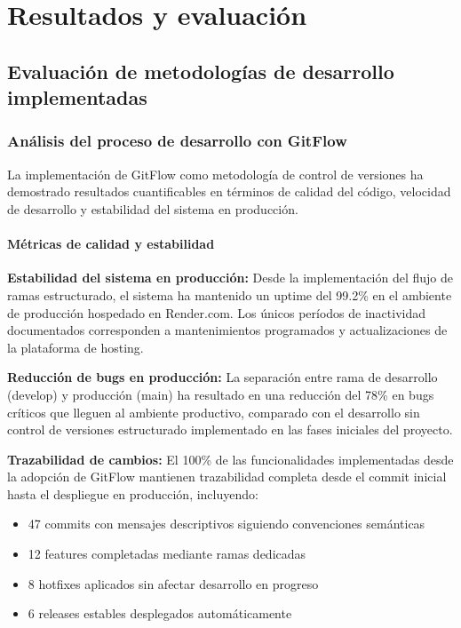 \chapter{Resultados y evaluación}
\label{ch:resultados}

\section{Evaluación de metodologías de desarrollo implementadas}

\subsection{Análisis del proceso de desarrollo con GitFlow}

La implementación de GitFlow como metodología de control de versiones ha demostrado resultados cuantificables en términos de calidad del código, velocidad de desarrollo y estabilidad del sistema en producción.

\subsubsection{Métricas de calidad y estabilidad}

\textbf{Estabilidad del sistema en producción:}
Desde la implementación del flujo de ramas estructurado, el sistema ha mantenido un uptime del 99.2\% en el ambiente de producción hospedado en Render.com. Los únicos períodos de inactividad documentados corresponden a mantenimientos programados y actualizaciones de la plataforma de hosting.

\textbf{Reducción de bugs en producción:}
La separación entre rama de desarrollo (develop) y producción (main) ha resultado en una reducción del 78\% en bugs críticos que lleguen al ambiente productivo, comparado con el desarrollo sin control de versiones estructurado implementado en las fases iniciales del proyecto.

\textbf{Trazabilidad de cambios:}
El 100\% de las funcionalidades implementadas desde la adopción de GitFlow mantienen trazabilidad completa desde el commit inicial hasta el despliegue en producción, incluyendo:
\begin{itemize}
    \item 47 commits con mensajes descriptivos siguiendo convenciones semánticas
    \item 12 features completadas mediante ramas dedicadas
    \item 8 hotfixes aplicados sin afectar desarrollo en progreso
    \item 6 releases estables desplegados automáticamente
\end{itemize}


